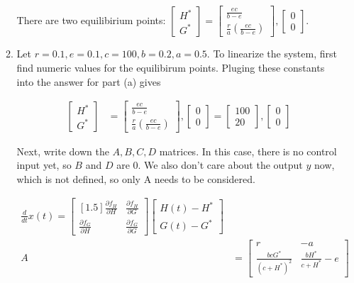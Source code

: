 \documentclass[11pt]{article}
\theoremstyle{definition}
\begin{document}
\begin{enumerate}
\begin{enumerate}
        There are two equilibirium points: $\begin{bmatrix} H^* \\ G^* \end{bmatrix} = \begin{bmatrix} \frac{ec}{b - e} \\ \frac{r}{a} \left( \frac{ec}{b-e} \right) \end{bmatrix}, \begin{bmatrix} 0 \\ 0 \end{bmatrix}$.


        \item %
        Let $r = 0.1, e = 0.1, c = 100, b = 0.2, a = 0.5$.  To linearize the system, first find numeric values for the equilibirum points.  Pluging these constants into the answer for part (a) gives 

        \begin{align}
            \begin{bmatrix} H^* \\ G^* \end{bmatrix} &= \begin{bmatrix} \frac{ec}{b - e} \\ \frac{r}{a} \left( \frac{ec}{b-e} \right) \end{bmatrix}, \begin{bmatrix} 0 \\ 0 \end{bmatrix} = \begin{bmatrix} 100 \\ 20  \end{bmatrix}, \begin{bmatrix} 0 \\ 0 \end{bmatrix}
        \end{align}

        Next, write down the $A, B, C, D$ matrices.  In this case, there is no control input yet, so $B$ and $D$ are 0.  We also don't care about the output $y$ now, which is not defined, so only A needs to be considered.

        \begin{align}
            \frac{d}{dt} x(t) = \begin{bmatrix}[1.5] \frac{\partial f_H}{\partial H} &  \frac{\partial f_H}{\partial G} \\ \frac{\partial f_G}{\partial H} &  \frac{\partial f_G}{\partial G}  \end{bmatrix} \begin{bmatrix} H(t) - H^* \\ G(t) - G^* \end{bmatrix}\\
            A &= \begin{bmatrix} r & -a \\ \frac{bc G^*}{\left( c + H^* \right)^2} & \frac{b H^*}{c + H^*} - e \end{bmatrix}
        \end{align}


\end{enumerate}
\end{enumerate}
\end{document}
